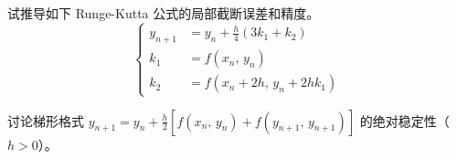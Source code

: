 \documentclass[11pt]{article}
\begin{document}
\maketitle

\thispagestyle{empty}

\newpage

\begin{question}

    \questiontext
    {
        试推导如下 Runge-Kutta 公式的局部截断误差和精度。
        \begin{equation*}
            \left\{
            \begin{aligned}
                y_{n + 1} & = y_{n} + \frac{h}{4}(3k_{1} + k_{2}) \\
                k_{1}     & = f(x_{n},\, y_{n})                   \\
                k_{2}     & = f(x_{n} + 2h,\, y_{n} + 2hk_{1})
            \end{aligned}
            \right.
        \end{equation*}
    }
    \answer
    {

    }
\end{question}

\begin{question}
    \questiontext
    {
        讨论梯形格式 $y_{n + 1} = y_{n} + \displaystyle \frac{h}{2}\left[f(x_{n},\, y_{n}) + f(y_{n + 1},\, y_{n + 1})\right]$ 的绝对稳定性（$h > 0$）。
    }
    \answer
    {

    }
\end{question}
\end{document}
